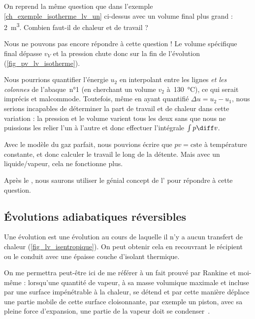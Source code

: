 			\begin{anexample}
				\label{ch_exemple_isotherme_lv_deux}
			
			On reprend la même question que dans l’exemple \ref{ch_exemple_isotherme_lv_un} ci-dessus avec un volume final plus grand : \SI{2}{\metre\cubed}. Combien faut-il de chaleur et de travail ?
					
				\begin{answer}
				Nous ne pouvons pas encore répondre à cette question ! Le volume spécifique final dépasse $v_V$ et la pression chute donc sur la fin de l’évolution (\cref{fig_pv_lv_isotherme}).
				
				Nous pourrions quantifier l’énergie $u_2$ en interpolant entre les lignes \emph{et les colonnes} de l’abaque~n°1 (en cherchant un volume $v_2$ à~\SI{130}{\degreeCelsius}), ce qui serait imprécis et malcommode. Toutefois, même en ayant quantifié $\Delta u = u_2 - u_1$, nous serions incapables de déterminer la part de travail et de chaleur dans cette variation : la pression et le volume varient tous les deux sans que nous ne puissions les relier l’un à l’autre et donc effectuer l’intégrale $\int p \diff v$. 
				
				\begin{remark}Avec le modèle du gaz parfait, nous pouvions écrire que $p v = \text{cste}$ à température constante, et donc calculer le travail le long de la détente. Mais avec un liquide/vapeur, cela ne fonctionne plus.\end{remark}
				\begin{remark}Après le \courshuitshort, nous saurons utiliser le génial concept de l’ pour répondre à cette question.\end{remark}\end{answer}
			\end{anexample}


	\subsection{Évolutions adiabatiques réversibles}
		\label{ch_lv_isentropiques}

		Une évolution  est une évolution au cours de laquelle il n’y a aucun transfert de chaleur (\cref{fig_lv_isentropique}). On peut obtenir cela en recouvrant le récipient ou le conduit avec une épaisse couche d’isolant thermique.
		
		On me permettra peut-être ici de me référer à un fait prouvé par Rankine et moi-même : lorsqu’une quantité de vapeur, à sa masse volumique maximale et incluse par une surface impénétrable à la chaleur, se détend et par cette manière déplace une partie mobile de cette surface cloisonnante, par exemple un piston, avec sa pleine force d’expansion, une partie de la vapeur doit se condenser~\jecourte.


